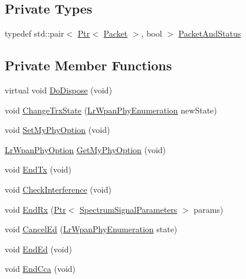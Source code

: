 \subsection*{Private Types}
\begin{DoxyCompactItemize}
\item 
typedef std\+::pair$<$ \hyperlink{classns3_1_1Ptr}{Ptr}$<$ \hyperlink{classns3_1_1Packet}{Packet} $>$, bool $>$ \hyperlink{classns3_1_1LrWpanPhy_a02f7c4a90f352f4089053ad2aed60a4f}{Packet\+And\+Status}
\end{DoxyCompactItemize}
\subsection*{Private Member Functions}
\begin{DoxyCompactItemize}
\item 
virtual void \hyperlink{classns3_1_1LrWpanPhy_acb5cbcd11fdc3712f5a577f3c03849a7}{Do\+Dispose} (void)
\item 
void \hyperlink{classns3_1_1LrWpanPhy_a149987679698c2878d941fac1238c41a}{Change\+Trx\+State} (\hyperlink{group__lr-wpan_ga6494269d13d45c511a07b7ccbb1de754}{Lr\+Wpan\+Phy\+Enumeration} new\+State)
\item 
void \hyperlink{classns3_1_1LrWpanPhy_a624a2aee1e304c52523cf071f16ed79d}{Set\+My\+Phy\+Option} (void)
\item 
\hyperlink{group__lr-wpan_ga23ee18bb5f5136211c75a7f58673db52}{Lr\+Wpan\+Phy\+Option} \hyperlink{classns3_1_1LrWpanPhy_a451aaf0c8528a821877279b1f92d73e4}{Get\+My\+Phy\+Option} (void)
\item 
void \hyperlink{classns3_1_1LrWpanPhy_afbb3b6c22ee0925f9019b703c02d3ed3}{End\+Tx} (void)
\item 
void \hyperlink{classns3_1_1LrWpanPhy_a8a339fadde6f27b6a495377a4eca7943}{Check\+Interference} (void)
\item 
void \hyperlink{classns3_1_1LrWpanPhy_a3a6d92e9b81bb3209b990e6ab12f37b3}{End\+Rx} (\hyperlink{classns3_1_1Ptr}{Ptr}$<$ \hyperlink{structns3_1_1SpectrumSignalParameters}{Spectrum\+Signal\+Parameters} $>$ params)
\item 
void \hyperlink{classns3_1_1LrWpanPhy_af05ebca568ec11ec5621f9d361d77295}{Cancel\+Ed} (\hyperlink{group__lr-wpan_ga6494269d13d45c511a07b7ccbb1de754}{Lr\+Wpan\+Phy\+Enumeration} state)
\item 
void \hyperlink{classns3_1_1LrWpanPhy_af0dc21f11ee72a14d71faf03f52ee312}{End\+Ed} (void)
\item 
void \hyperlink{classns3_1_1LrWpanPhy_aa7f39e82e542534c3b7a4a9802335f6a}{End\+Cca} (void)

\end{DoxyCompactItemize}
